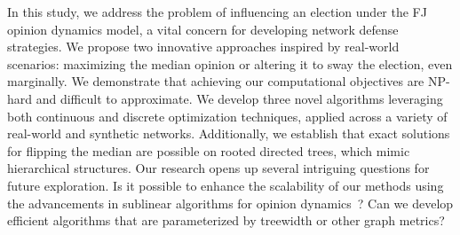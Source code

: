 In this study, we address the problem of influencing an election under the FJ opinion dynamics model, a vital concern for developing network defense strategies. We propose two innovative approaches inspired by real-world scenarios: maximizing the median opinion or altering it to sway the election, even marginally. We demonstrate that achieving our computational objectives are NP-hard and difficult to approximate. We develop three novel algorithms leveraging both continuous and discrete optimization techniques, applied across a variety of real-world and synthetic networks. Additionally, we establish that exact solutions for flipping the median are possible on rooted directed trees, which mimic hierarchical structures. Our research opens up several intriguing questions for future exploration. Is it possible to enhance the scalability of our methods using the advancements in sublinear algorithms for opinion dynamics~\cite{neumann2024sublinear}? Can we develop efficient algorithms that are parameterized by treewidth or other graph metrics?

 
